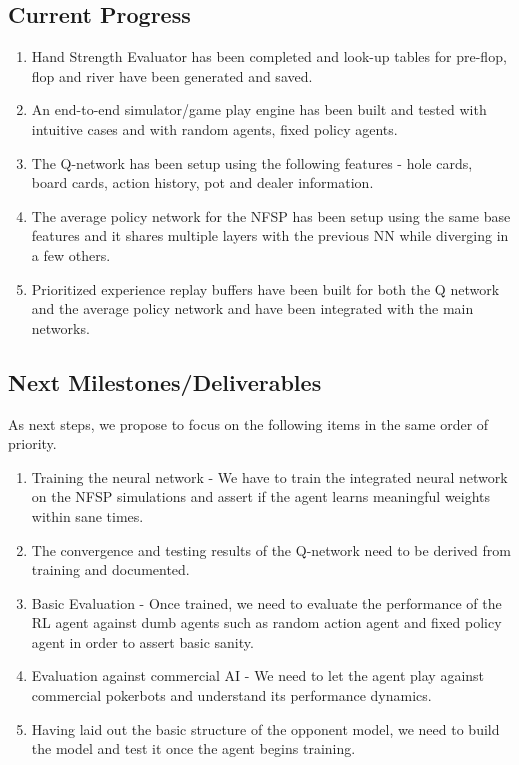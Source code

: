 \documentclass{article}
\begin{document}
\subsection{Current Progress}
\begin{enumerate}
\item Hand Strength Evaluator has been completed and look-up tables for pre-flop, flop and river have been generated and saved.
\item An end-to-end simulator/game play engine has been built and tested with intuitive cases and with random agents, fixed policy agents.
\item The Q-network has been setup using the following features - hole cards, board cards, action history, pot and dealer information.
\item The average policy network for the NFSP has been setup using the same base features and it shares multiple layers with the previous NN while diverging in a few others.
\item Prioritized experience replay buffers have been built for both the Q network and the average policy network and have been integrated with the main networks.
\end{enumerate}
\subsection{Next Milestones/Deliverables}
As next steps, we propose to focus on the following items in the same order of priority.
\begin{enumerate}
\item Training the neural network - We have to train the integrated neural network on the NFSP simulations and assert if the agent learns meaningful weights within sane times.
\item The convergence and testing results of the Q-network need to be derived from training and documented. 
\item Basic Evaluation - Once trained, we need to evaluate the performance of the RL agent against dumb agents such as random action agent and fixed policy agent in order to assert basic sanity.
\item Evaluation against commercial AI - We need to let the agent play against commercial pokerbots and understand its performance dynamics.
\item Having laid out the basic structure of the opponent model, we need to build the model and test it once the agent begins training. 
\end{enumerate}
\end{document}
